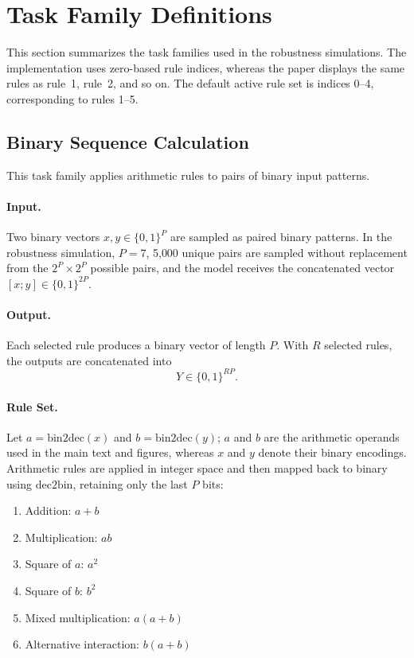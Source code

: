 \documentclass{article}
\begin{document}
\section{Task Family Definitions}
\label{appendix:tasks}

This section summarizes the task families used in the robustness simulations. The implementation uses zero-based rule indices, whereas the paper displays the same rules as rule~1, rule~2, and so on. The default active rule set is indices 0--4, corresponding to rules 1--5.

\subsection{Binary Sequence Calculation}
\label{appendix:binary_sequence}

This task family applies arithmetic rules to pairs of binary input patterns.

\paragraph{Input.}
Two binary vectors $x,y \in \{0,1\}^{P}$ are sampled as paired binary patterns. In the robustness simulation, $P=7$, 5{,}000 unique pairs are sampled without replacement from the $2^P\times2^P$ possible pairs, and the model receives the concatenated vector $[x;y]\in\{0,1\}^{2P}$.

\paragraph{Output.}
Each selected rule produces a binary vector of length $P$. With $R$ selected rules, the outputs are concatenated into
\[
Y \in \{0,1\}^{RP}.
\]

\paragraph{Rule Set.}
Let $a=\mathrm{bin2dec}(x)$ and $b=\mathrm{bin2dec}(y)$; $a$ and $b$ are the arithmetic operands used in the main text and figures, whereas $x$ and $y$ denote their binary encodings. Arithmetic rules are applied in integer space and then mapped back to binary using $\mathrm{dec2bin}$, retaining only the last $P$ bits:
\begin{enumerate}
    \item Addition: $a+b$
    \item Multiplication: $ab$
    \item Square of $a$: $a^2$
    \item Square of $b$: $b^2$
    \item Mixed multiplication: $a(a+b)$
    \item Alternative interaction: $b(a+b)$
\end{enumerate}
\end{document}

